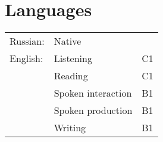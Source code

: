 \documentclass[a4paper,10pt]{article}
\begin{document}
\section{Languages}
\begin{tabular}{ll|l}
    Russian:                & \multicolumn{2}{l}{Native} \\
    English\footnotemark :  & Listening             & C1 \\
                            & Reading               & C1 \\
                            & Spoken interaction    & B1 \\
                            & Spoken production     & B1 \\
                            & Writing               & B1 \\
    
\end{tabular}
\end{document}
